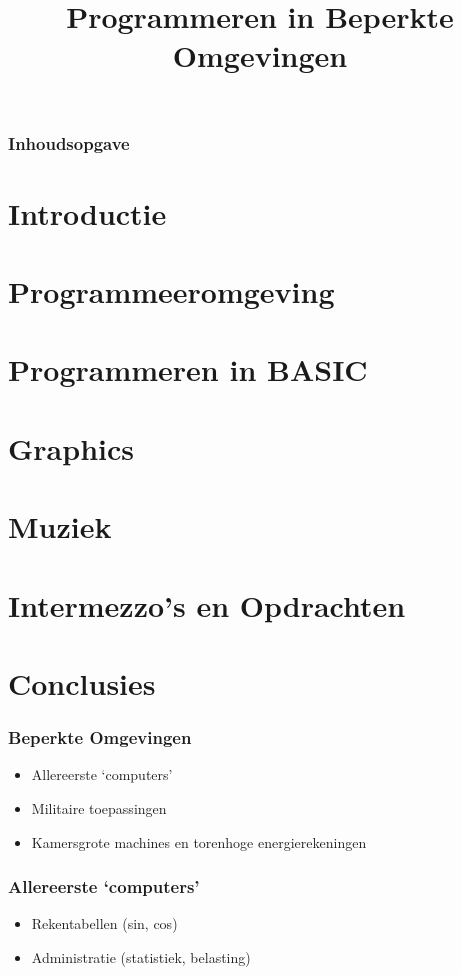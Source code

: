 \documentclass[aspectratio=43]{uva-inf-presentation}
\title{Programmeren in Beperkte Omgevingen}
\begin{document}
\begin{titelframe}
\titlepage

\end{titelframe}

\begin{frame}
\frametitle{Inhoudsopgave}
\tableofcontents
\end{frame}

\section{Introductie}
\section{Programmeeromgeving}
\section{Programmeren in BASIC}
\section{Graphics}
\section{Muziek}
\section{Intermezzo's en Opdrachten}

\section{Conclusies}


\begin{frame}
\frametitle{Beperkte Omgevingen}

\begin{itemize}
\item Allereerste `computers'
\item Militaire toepassingen
\item Kamersgrote machines en torenhoge energierekeningen
\end{itemize}

\end{frame}


\begin{frame}
\frametitle{Allereerste `computers'}

\begin{itemize}
\item Rekentabellen (sin, cos)
\item Administratie (statistiek, belasting)
\end{itemize}

\end{frame}
\end{document}
